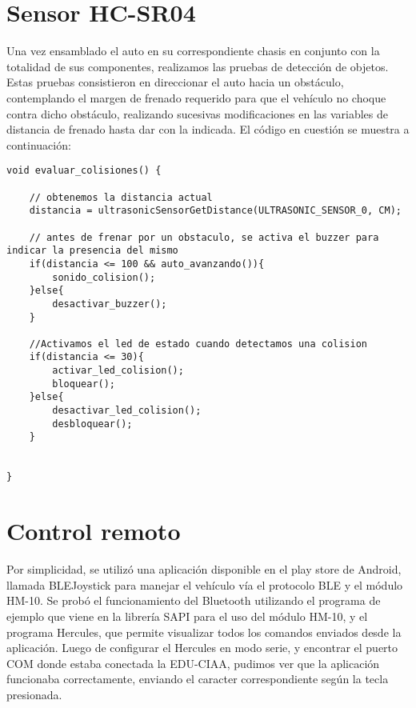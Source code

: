 \section{Sensor HC-SR04}

Una vez ensamblado el auto en su correspondiente chasis en conjunto con
la totalidad de sus componentes, realizamos las pruebas de detección de
objetos. Estas pruebas consistieron en direccionar el auto hacia un
obstáculo, contemplando el margen de frenado requerido para que el
vehículo no choque contra dicho obstáculo, realizando sucesivas
modificaciones en las variables de distancia de frenado hasta dar con la
indicada. El código en cuestión se muestra a continuación:

\begin{lstlisting}
void evaluar_colisiones() {

    // obtenemos la distancia actual
    distancia = ultrasonicSensorGetDistance(ULTRASONIC_SENSOR_0, CM);

    // antes de frenar por un obstaculo, se activa el buzzer para indicar la presencia del mismo
    if(distancia <= 100 && auto_avanzando()){
        sonido_colision();
    }else{
        desactivar_buzzer();
    }

    //Activamos el led de estado cuando detectamos una colision
    if(distancia <= 30){
        activar_led_colision();
        bloquear();
    }else{
        desactivar_led_colision();
        desbloquear();
    }


}
\end{lstlisting}

\section{Control remoto}

Por simplicidad, se utilizó una aplicación disponible en el play store
de Android, llamada BLEJoystick para manejar el vehículo vía el
protocolo BLE y el módulo HM-10. Se probó el funcionamiento del
Bluetooth utilizando el programa de ejemplo que viene en la librería
SAPI para el uso del módulo HM-10, y el programa Hercules, que permite
visualizar todos los comandos enviados desde la aplicación. Luego de
configurar el Hercules en modo serie, y encontrar el puerto COM donde
estaba conectada la EDU-CIAA, pudimos ver que la aplicación funcionaba
correctamente, enviando el caracter correspondiente según la tecla
presionada.

